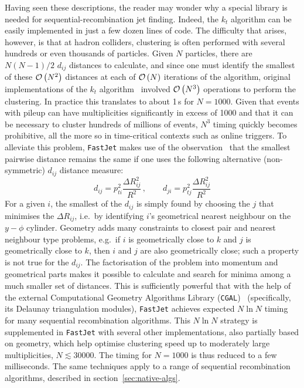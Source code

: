 \documentclass[12pt,a4]{article}
\newcommand{\fastjet}{\texttt{FastJet}\xspace}
\newcommand{\ttt}[1]{{\small\texttt{#1}}}
\newcommand{\order}[1]{{\cal O}\left(#1\right)}
\begin{document}
Having seen these descriptions, the reader may wonder why a special
library is needed for sequential-recombination jet finding. 
%
Indeed, the $k_t$ algorithm can be easily implemented in just a few
dozen lines of code.
%
The difficulty that arises, however, is that at hadron colliders,
clustering is often performed with several hundreds or even thousands
of particles.
% 
Given $N$ particles, there are $N(N-1)/2$ $d_{ij}$ distances to
calculate, and since one must identify the smallest of these
$\order{N^2}$ distances at each of $\order{N}$ iterations of the
algorithm, original implementations of the $k_t$
algorithm~\cite{KtClus,KtJet} involved $\order{N^3}$ operations to
perform the clustering.
%
In practice this translates to about 1\,s for $N=1000$. Given that
events with pileup can have multiplicities significantly in excess of
1000 and that it can be necessary to cluster hundreds of millions of
events, $N^3$ timing quickly becomes prohibitive, all the more so in
time-critical contexts such as online triggers.
%
To alleviate this problem, \fastjet makes use of the
observation~\cite{fastjet} that the smallest pairwise distance remains
the same if one uses the following alternative (non-symmetric)
$d_{ij}$ distance measure:
\begin{equation}
  \label{eq:dij-illustr-asym}
  d_{ij} = p_{ti}^2 \frac{\Delta R_{ij}^2}{R^2}\,,\qquad
  d_{ji} = p_{tj}^2 \frac{\Delta R_{ij}^2}{R^2}
\end{equation}
For a given $i$, the smallest of the $d_{ij}$ is simply found by
choosing the $j$ that minimises the $\Delta R_{ij}$, i.e.\ by
identifying $i$'s geometrical nearest neighbour on the $y-\phi$
cylinder.
%
Geometry adds many constraints to closest pair and nearest neighbour
type problems, e.g.\ if $i$ is geometrically close to $k$ and $j$ is
geometrically close to $k$, then $i$ and $j$ are also geometrically
close; such a property is not true for the $d_{ij}$. The factorisation
of the problem into momentum and geometrical parts makes it possible
to calculate and search for minima among a much smaller set of
distances.
%
This is sufficiently powerful that with the help of the external
Computational Geometry Algorithms Library (\ttt{CGAL})~\cite{CGAL}
(specifically, its Delaunay triangulation modules), \fastjet achieves
expected $N\ln N$ timing for many sequential recombination algorithms.
%
This $N\ln N$ strategy is supplemented in \fastjet with several other
implementations, also partially based on geometry, which help optimise
clustering speed up to moderately large multiplicities, $N \lesssim
30000$.
%
The timing for $N=1000$ is thus reduced to a few milliseconds.
%
The same techniques apply to a range of sequential recombination
algorithms, described in section~\ref{sec:native-algs}.
\end{document}
